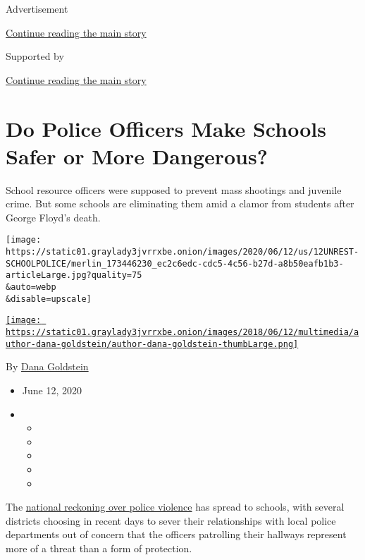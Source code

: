 Advertisement

\protect\hyperlink{after-top}{Continue reading the main story}

Supported by

\protect\hyperlink{after-sponsor}{Continue reading the main story}

\hypertarget{do-police-officers-make-schools-safer-or-more-dangerous}{%
\section{Do Police Officers Make Schools Safer or More
Dangerous?}\label{do-police-officers-make-schools-safer-or-more-dangerous}}

School resource officers were supposed to prevent mass shootings and
juvenile crime. But some schools are eliminating them amid a clamor from
students after George Floyd's death.

\texttt{[image: https://static01.graylady3jvrrxbe.onion/images/2020/06/12/us/12UNREST-SCHOOLPOLICE/merlin\_173446230\_ec2c6edc-cdc5-4c56-b27d-a8b50eafb1b3-articleLarge.jpg?quality=75\\\&auto=webp\\\&disable=upscale]}

\href{https://www.nytimes3xbfgragh.onion/by/dana-goldstein}{\texttt{[image: https://static01.graylady3jvrrxbe.onion/images/2018/06/12/multimedia/author-dana-goldstein/author-dana-goldstein-thumbLarge.png]}}

By \href{https://www.nytimes3xbfgragh.onion/by/dana-goldstein}{Dana
Goldstein}

\begin{itemize}
\item
  June 12, 2020
\item
  \begin{itemize}
  \item
  \item
  \item
  \item
  \item
  \end{itemize}
\end{itemize}

The
\href{https://www.nytimes3xbfgragh.onion/news-event/george-floyd-protests-minneapolis-new-york-los-angeles}{national
reckoning over police violence} has spread to schools, with several
districts choosing in recent days to sever their relationships with
local police departments out of concern that the officers patrolling
their hallways represent more of a threat than a form of protection.

